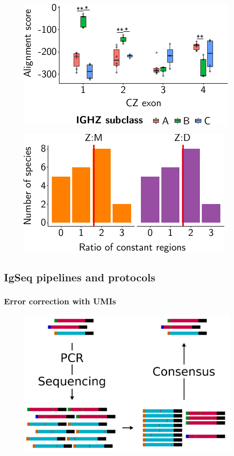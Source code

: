 \documentclass[presentation]{beamer}
\newlength{\slideheight}
\begin{document}
\begin{frame}
\begin{figure}
\centering
\includegraphics[height=0.6\textheight]{figs/pdf/extra/cz-trees-ppl}
\end{figure}
\end{frame}

\begin{frame}
\begin{figure}
\centering
\includegraphics[height=0.6\textheight]{figs/pdf/extra/cz-trees-ratios}
\end{figure}
\end{frame}

\subsection{IgSeq pipelines and protocols}

\begin{frame}
\frametitle{Error correction with UMIs}
\begin{figure}
\includegraphics[height=0.9\slideheight]{figs/pdf/extra/umi-consensus}
\end{figure}
\end{frame}
\end{document}
